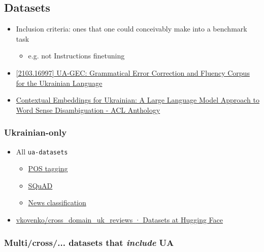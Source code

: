 \subsection{Datasets}\label{datasets}

\begin{itemize}
\tightlist
\item
  Inclusion criteria: ones that one could conceivably make into a
  benchmark task

  \begin{itemize}
  \tightlist
  \item
    e.g. not Instructions finetuning
  \end{itemize}
\item
  \href{https://arxiv.org/abs/2103.16997}{{[}2103.16997{]} UA-GEC:
  Grammatical Error Correction and Fluency Corpus for the Ukrainian
  Language}\cite{Syvokon2022}
\item
  \href{https://aclanthology.org/2023.unlp-1.2/}{Contextual Embeddings
  for Ukrainian: A Large Language Model Approach to Word Sense
  Disambiguation - ACL
  Anthology}\cite{labaContextualEmbeddingsUkrainian2023}
\end{itemize}

\subsubsection{Ukrainian-only}\label{ukrainian-only}

\begin{itemize}
\tightlist
\item
  All \texttt{ua-datasets}

  \begin{itemize}
  \tightlist
  \item
    \href{https://github.com/fido-ai/ua-datasets/tree/main/ua_datasets/src/token_classification}{POS
    tagging}
  \item
    \href{https://github.com/fido-ai/ua-datasets/tree/main/ua_datasets/src/question_answering}{SQuAD}
  \item
    \href{https://github.com/fido-ai/ua-datasets/tree/main/ua_datasets/src/text_classification}{News
    classification}
  \end{itemize}
\item
  \href{https://huggingface.co/datasets/vkovenko/cross_domain_uk_reviews}{vkovenko/cross\_domain\_uk\_reviews
  · Datasets at Hugging Face}
\end{itemize}

\subsubsection{\texorpdfstring{Multi/cross/... datasets that
\emph{include}
UA}{Multi/cross/... datasets that include UA}}\label{multicross-datasets-that-include-ua}

